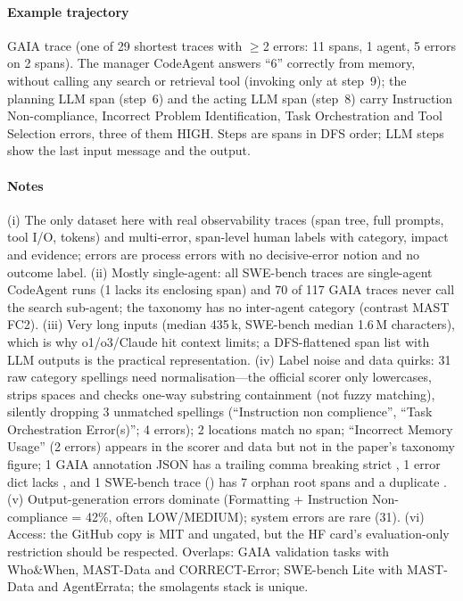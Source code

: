 \paragraph{Example trajectory} GAIA trace  (one of 29 shortest traces with $\ge$2 errors: 11 spans, 1 agent, 5 errors on 2 spans). The manager CodeAgent answers ``6'' correctly from memory, without calling any search or retrieval tool (invoking only  at step~9); the planning LLM span (step~6) and the acting LLM span (step~8) carry Instruction Non-compliance, Incorrect Problem Identification, Task Orchestration and Tool Selection errors, three of them HIGH. Steps are spans in DFS order; LLM steps show the last input message and the output.


\paragraph{Notes} (i) The only dataset here with real observability traces (span tree, full prompts, tool I/O, tokens) and multi-error, span-level human labels with category, impact and evidence; errors are process errors with no decisive-error notion and no outcome label. (ii) Mostly single-agent: all SWE-bench traces are single-agent CodeAgent runs (1 lacks its enclosing  span) and 70 of 117 GAIA traces never call the search sub-agent; the taxonomy has no inter-agent category (contrast MAST FC2). (iii) Very long inputs (median 435\,k, SWE-bench median 1.6\,M characters), which is why o1/o3/Claude hit context limits; a DFS-flattened span list with LLM outputs is the practical representation. (iv) Label noise and data quirks: 31 raw category spellings need normalisation---the official scorer only lowercases, strips spaces and checks one-way substring containment (not fuzzy matching), silently dropping 3 unmatched spellings (``Instruction non complience'', ``Task Orchestration Error(s)''; 4 errors); 2 locations match no span; ``Incorrect Memory Usage'' (2 errors) appears in the scorer and data but not in the paper's taxonomy figure; 1 GAIA annotation JSON has a trailing comma breaking strict , 1 error dict lacks , and 1 SWE-bench trace () has 7 orphan root spans and a duplicate . (v) Output-generation errors dominate (Formatting + Instruction Non-compliance = 42\%, often LOW/MEDIUM); system errors are rare (31). (vi) Access: the GitHub copy is MIT and ungated, but the HF card's evaluation-only restriction should be respected. Overlaps: GAIA validation tasks with Who\&When, MAST-Data and CORRECT-Error; SWE-bench Lite with MAST-Data and AgentErrata; the smolagents stack is unique.
